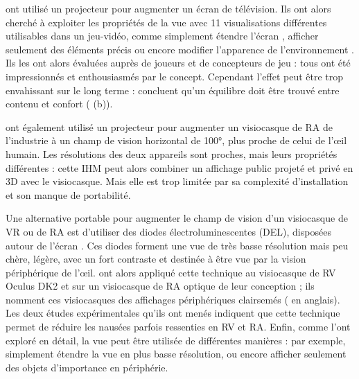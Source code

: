 \cite{Jones2013} ont utilisé un projecteur pour augmenter un écran de télévision. Ils ont alors cherché à exploiter les propriétés de la vue  avec 11 visualisations différentes utilisables dans un jeu-vidéo, comme simplement étendre l'écran , afficher seulement des éléments précis  ou encore modifier l'apparence de l'environnement . Ils les ont alors évaluées auprès de joueurs et de concepteurs de jeu : tous ont été impressionnés et enthousiasmés par le concept. Cependant l'effet peut être trop envahissant sur le long terme : \cite{Jones2013} concluent qu'un équilibre doit être trouvé entre contenu et confort ( (b)).


\cite{Benko2015} ont également utilisé un projecteur pour augmenter un visiocasque de RA de l'industrie  à un champ de vision horizontal de \ang{100}, plus proche de celui de l'\oe il humain. Les résolutions des deux appareils sont proches, mais leurs propriétés différentes : cette IHM peut alors combiner un affichage public projeté et privé en 3D avec le visiocasque. Mais elle est trop limitée par sa complexité d'installation et son manque de portabilité.


Une alternative portable pour augmenter le champ de vision d'un visiocasque de VR ou de RA est d'utiliser des diodes électroluminescentes (DEL), disposées autour de l'écran . Ces diodes forment une vue  de très basse résolution mais peu chère, légère, avec un fort contraste et destinée à être vue par la vision périphérique de l'\oe il. \cite{Xiao2016} ont alors appliqué cette technique au visiocasque de RV Oculus DK2 et sur un visiocasque de RA optique de leur conception ; ils nomment ces visiocasques des affichages périphériques clairsemés ( en anglais). Les deux études expérimentales qu'ils ont menés indiquent que cette technique permet de réduire les nausées parfois ressenties en RV et RA. Enfin, comme \cite{Jones2013} l'ont exploré en détail, la vue  peut être utilisée de différentes manières : par exemple, simplement étendre la vue  en plus basse résolution, ou encore afficher seulement des objets d'importance en périphérie.

